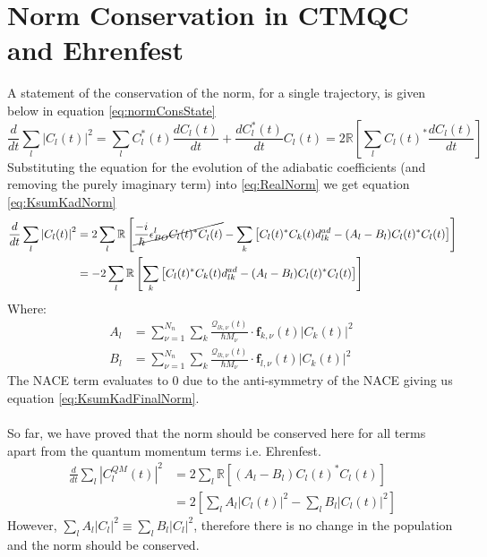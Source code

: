 \chapter{Norm Conservation in CTMQC and Ehrenfest}
\label{ap:norm_cons}
A statement of the conservation of the norm, for a single trajectory, is given below in equation \eqref{eq:normConsState}
\begin{equation}
	\frac{d}{dt} \sum_{l} \left\vert C_{l}(t) \right\vert^2 = \sum_{l} C_{l}^{*}(t)\frac{d C_{l}(t)}{dt} + \frac{d C_{l}^{*}(t)}{dt}C_{l}(t)
	\label{eq:normConsState} = 2 \mathbb{R} \left[ \sum_{l} C_{l}(t)^{*} \frac{d C_{l}(t)}{dt} \right]
\end{equation}
Substituting the equation for the evolution of the adiabatic coefficients (and removing the purely imaginary term) into \eqref{eq:RealNorm} we get equation \eqref{eq:KsumKadNorm}
\begin{align}
	\frac{d}{dt} \sum_{l} \left\vert C_{l}(t) \right\vert^2 &= 2 \sum_{l} \mathbb{R} \left[ \cancel{\frac{-i}{\hbar} \epsilon_{BO}^{l} C_l(t)^*C_l^{}(t)}
	- \sum_{k} \left[ C_l(t)^*C_k(t) d_{lk}^{ad} - (A_l - B_{l}) C_l(t)^*C_l(t)  \right] \right]
	\\
	&= -2 \sum_{l} \mathbb{R} \left[ \sum_{k} \left[ C_l(t)^*C_k(t) d_{lk}^{ad} - (A_l - B_{l}) C_l(t)^*C_l(t)  \right] \right]
	\label{eq:KsumKadNorm}
\end{align}
Where:
\begin{align}
	A_{l} &= \sum_{\nu = 1}^{N_n} \sum_{k} \frac{\mathcal{Q}_{lk, \nu}(t)}{\hbar M_\nu}\cdot \mathbf{f}_{k, \nu}(t) \vert C_k(t) \vert^2 \ \\
	B_{l} &= \sum_{\nu = 1}^{N_n} \sum_{k} \frac{\mathcal{Q}_{lk, \nu}(t)}{\hbar M_\nu}\cdot \mathbf{f}_{l, \nu}(t) \vert C_{k}(t)\vert^2
\end{align}
The NACE term evaluates to 0 due to the anti-symmetry of the NACE giving us equation \eqref{eq:KsumKadFinalNorm}. 
\\\\
So far, we have proved that the norm should be conserved here for all terms apart from the quantum momentum terms i.e. Ehrenfest.
\begin{align}
	\frac{d}{dt} \sum_{l} \left\vert C^{QM}_{l}(t) \right\vert^2 &= 2 \sum_{l} \mathbb{R} \left[ (A_l - B_{l}) C_l(t)^*C_l(t)  \right] \\
	&= 2 \left[ \sum_l A_l |C_{l}(t)|^2 - \sum_{l} B_{l} \vert C_{l}(t) \vert^2 \right]
	\label{eq:KsumKadFinalNorm}
\end{align}
However, $\sum_{l}A_l |C_{l}|^2 \equiv \sum_{l} B_{l} |C_{l}|^2$, therefore there is no change in the population and the norm should be conserved.
\newpage
